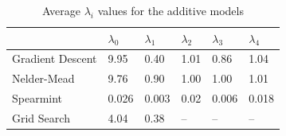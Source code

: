 \documentclass[12pt]{article}
\begin{document}
\begin{table}
\caption {\label{tab:additive_average_lambda} Average $\lambda_i$ values for the additive models}
\centering
\begin{tabular}{| l | l | l | l | l | l | }
\hline
& $\lambda_0$ & $\lambda_1$ & $\lambda_2$ & $\lambda_3$ & $\lambda_4$\\
\hline
Gradient Descent & 9.95 & 0.40 & 1.01 & 0.86 & 1.04 \\
\hline
Nelder-Mead & 9.76 & 0.90 & 1.00 & 1.00 & 1.01 \\
\hline
Spearmint & 0.026 & 0.003 & 0.02 & 0.006 & 0.018\\
\hline
Grid Search & 4.04 & 0.38 & -- & -- & -- \\
\hline
\end{tabular}
\end{table}
\end{document}
